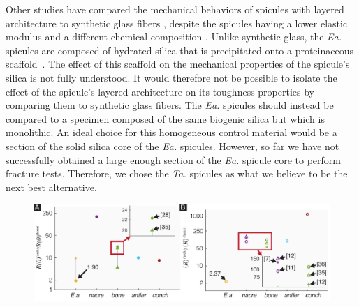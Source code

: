 \documentclass[12pt,onecolumn]{article}
\makeatletter
\newcommand{\TA}{\textit{Ta.\@}\xspace}
\newcommand{\EA}{\textit{Ea.\@}\xspace}
\makeatother
\begin{document}
\begin{bibunit}
Other studies have compared the mechanical behaviors of spicules with layered architecture to synthetic glass fibers \cite{johnson2010influence,levi1989remarkably,walter2007mechanisms,weaver2010unifying,mayer2005rigid}, despite the spicules having a lower elastic modulus and a different chemical composition \cite{arasuna2018structural, weaver2010unifying, woesz2006micromechanical}. Unlike synthetic glass, the \EA spicules are composed of hydrated silica that is precipitated onto a proteinaceous scaffold~\cite{ehrlich2010chitin}. The effect of this scaffold on the mechanical properties of the spicule's silica is not fully understood. It would therefore not be possible to isolate the effect of the spicule's layered architecture on its toughness properties by comparing them to synthetic glass fibers. The \EA spicules should instead be compared to a specimen composed of the same biogenic silica but which is monolithic. An ideal choice for this homogeneous control material would be a section of the solid silica core of the \EA spicules. However, so far we have not successfully obtained a large enough section of the \EA spicule core to perform fracture tests. Therefore, we chose the \TA spicules as what we believe to be the next best alternative.
%
			\begin{figure}[ht!]
			\centering
			\includegraphics[width=\textwidth]{../Figures/FigureSBMcomp/Figure6_V5.pdf}
			\caption{
}
\end{figure}
\end{bibunit}
\end{document}
